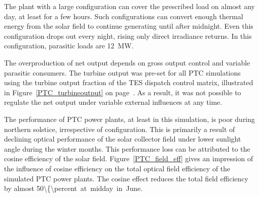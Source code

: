 The plant with a large configuration can cover the prescribed load on almost any day, at least for a few hours. Such configurations can convert enough thermal energy from the solar field to continue generating until after midnight. Even this configuration drops out every night, rising only direct irradiance returns. In this configuration, parasitic loads are \SI{12}{MW}. 



The overproduction of net output depends on gross output control and variable parasitic consumers. The turbine output was pre-set for all PTC simulations using the turbine output fraction of the TES dispatch control matrix, illustrated in Figure~\ref{PTC_turbineoutput} on page~\pageref{PTC_turbineoutput}. As a result, it was not possible to regulate the net output under variable external influences at any time.


The performance of PTC power plants, at least in this simulation, is poor during northern solstice, irrespective of configuration. This is primarily a result of declining optical performance of the solar collector field under lower sunlight angle during the winter months. This performance loss can be attributed to the cosine efficiency of the solar field. Figure~\ref{PTC_field_eff} gives an impression of the influence of cosine efficiency on the total optical field efficiency of the simulated PTC power plants. The cosine effect reduces the total field efficiency by almost \SI{50\{\percent} at midday in June. 


